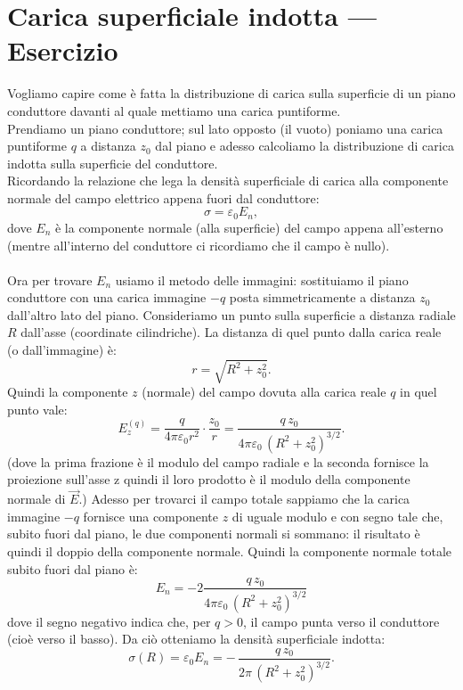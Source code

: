 \documentclass{book}
\begin{document}
\section{Carica superficiale indotta — Esercizio}
Vogliamo capire come è fatta la distribuzione di carica sulla superficie di un piano conduttore davanti al quale mettiamo una carica puntiforme.
\\
Prendiamo un piano conduttore; sul lato opposto (il vuoto) poniamo una carica puntiforme \(q\) a distanza \(z_0\) dal piano e adesso calcoliamo la distribuzione di carica indotta sulla superficie del conduttore.
\\
Ricordando la relazione che lega la densità superficiale di carica alla componente normale del campo elettrico appena fuori dal conduttore:
\[
\sigma=\varepsilon_0 E_n,
\]
dove \(E_n\) è la componente normale (alla superficie) del campo appena all'esterno (mentre all'interno del conduttore ci ricordiamo che il campo è nullo).
\\
\\
Ora per trovare \(E_n\) usiamo il metodo delle immagini: sostituiamo il piano conduttore con una carica immagine \(-q\) posta simmetricamente a distanza \(z_0\) dall'altro lato del piano. Consideriamo un punto sulla superficie a distanza radiale \(R\) dall'asse (coordinate cilindriche). La distanza di quel punto dalla carica reale (o dall'immagine) è:
\[
r=\sqrt{R^2+z_0^2}.
\]
Quindi la componente \(z\) (normale) del campo dovuta alla carica reale \(q\) in quel punto vale:
\[
E_z^{(q)}=\frac{q}{4\pi\varepsilon_0 r^2}\cdot\frac{z_0}{r}
=\frac{q\,z_0}{4\pi\varepsilon_0\,(R^2+z_0^2)^{3/2}}.
\]
(dove la prima frazione è il modulo del campo radiale e la seconda fornisce la proiezione sull'asse z quindi il loro prodotto è il modulo della componente normale di $\Vec{E}$.)
Adesso per trovarci il campo totale sappiamo che la carica immagine \(-q\) fornisce una componente \(z\) di uguale modulo e con segno tale che, subito fuori dal piano, le due componenti normali si sommano: il risultato è quindi il doppio della componente normale. Quindi la componente normale totale subito fuori dal piano è:
\[
E_n = -2\frac{q\,z_0}{4\pi\varepsilon_0\,(R^2+z_0^2)^{3/2}}
\]
dove il segno negativo indica che, per \(q>0\), il campo punta verso il conduttore (cioè verso il basso).
Da ciò otteniamo la densità superficiale indotta:
\[
\sigma(R)=\varepsilon_0 E_n = -\,\frac{q\,z_0}{2\pi\,(R^2+z_0^2)^{3/2}}.
\]
\end{document}
